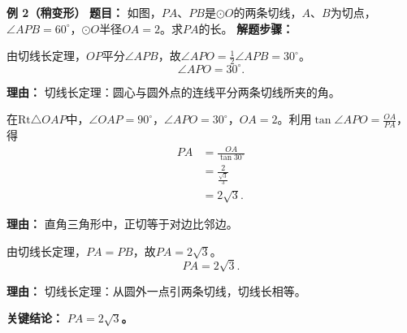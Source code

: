 \begin{examplebox}
	\medskip
	\textbf{\textcolor{CExample}{例 2（稍变形）}}
	\textbf{\textcolor{CExample}{题目：}}
	如图，$PA$、$PB$是$\odot O$的两条切线，$A$、$B$为切点，$\angle APB = 60^\circ$，$\odot O$半径$OA=2$。求$PA$的长。
	\textbf{\textcolor{CExample}{解题步骤：}}
	\begin{description}[style=nextline, leftmargin=2.8em, labelsep=0.5em, itemsep=0.45em]
		\item[\textbf{第一步（角平分）：}]
			由切线长定理，$OP$平分$\angle APB$，故$\angle APO = \frac12 \angle APB = 30^\circ$。
			\[
				\angle APO = 30^\circ.
			\]
			\par\textbf{理由：} 切线长定理：圆心与圆外点的连线平分两条切线所夹的角。
		\item[\textbf{第二步（三角函数）：}]
			在$\mathrm{Rt}\triangle OAP$中，$\angle OAP = 90^\circ$，$\angle APO = 30^\circ$，$OA=2$。利用$\tan\angle APO = \frac{OA}{PA}$，得
			\[
				\begin{aligned}
					PA &= \frac{OA}{\tan 30^\circ} \\ &= \frac{2}{\frac{\sqrt{3}}{3}} \\ &= 2\sqrt{3}.
			\end{aligned}
			\]
			\par\textbf{理由：} 直角三角形中，正切等于对边比邻边。
		\item[\textbf{第三步（切线长相等）：}]
			由切线长定理，$PA = PB$，故$PA = 2\sqrt{3}$。
			\[
				PA = 2\sqrt{3}.
			\]
			\par\textbf{理由：} 切线长定理：从圆外一点引两条切线，切线长相等。
	\end{description}
	\textbf{\textcolor{CExample}{关键结论：}}
	\textbf{$PA = 2\sqrt{3}$。}


\end{examplebox}
